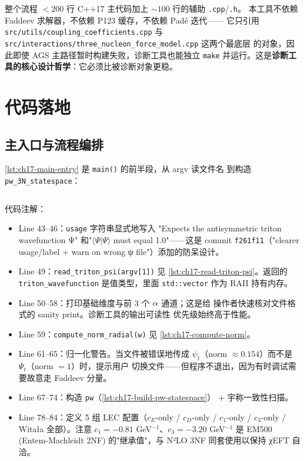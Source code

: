 整个流程 \(<200\) 行 C++17 主代码加上 \(\sim 100\) 行的辅助 \texttt{.cpp}/\texttt{.h}。
本工具不依赖 Faddeev 求解器，不依赖 P123 缓存，不依赖 Padé 迭代——
它只引用 \texttt{src/utils/coupling\_coefficients.cpp} 与
\texttt{src/interactions/three\_nucleon\_force\_model.cpp} 这两个最底层
的对象，因此即使 AGS 主路径暂时构建失败，诊断工具也能独立 \texttt{make}
并运行。这是\textbf{诊断工具的核心设计哲学}：它必须比被诊断对象更稳。

\section{代码落地}
\label{sec:ch17-code}

\subsection{主入口与流程编排}
\label{subsec:ch17-code-main}

\cref{lst:ch17-main-entry} 是 \texttt{main()} 的前半段，从 argv 读文件名
到构造 \texttt{pw\_3N\_statespace}：

\begin{lstlisting}[style=cpp, caption={check\_3nf\_normalization.cpp 主入口与归一化检查 (lines 41--86)}, label={lst:ch17-main-entry}]
\end{lstlisting}


代码注解：

\begin{itemize}
  \item Line 43--46：\texttt{usage} 字符串显式地写入 "Expects the
        antisymmetric triton wavefunction Ψ" 和"\(\langle\Psi|\Psi\rangle\)
        must equal 1.0"——这是 commit \texttt{f261f11}（"clearer
        usage/label + warn on wrong ψ file"）添加的防呆设计。
  \item Line 49：\texttt{read\_triton\_psi(argv[1])} 见
        \cref{lst:ch17-read-triton-psi}。返回的 \texttt{triton\_wavefunction}
        是值类型，里面 \texttt{std::vector} 作为 RAII 持有内存。
  \item Line 50--58：打印基础维度与前 3 个 \(\alpha\) 通道；这是给
        操作者快速核对文件格式的 sanity print。诊断工具的输出可读性
        优先级始终高于性能。
  \item Line 59：\texttt{compute\_norm\_radial(w)} 见
        \cref{lst:ch17-compute-norm}。
  \item Line 61--65：归一化警告。当文件被错误地传成 \(\psi_t\)（norm
        \(\approx 0.154\)）而不是 \(\Psi_t\)（norm \(=1\)）时，提示用户
        切换文件——但程序不退出，因为有时调试需要故意走 Faddeev 分量。
  \item Line 67--74：构造 \texttt{pw}（\cref{lst:ch17-build-pw-statespace}）
        + 宇称一致性扫描。
  \item Line 78--84：定义 5 组 LEC 配置（\(c_E\)-only / \(c_D\)-only /
        \(c_1\)-only / \(c_3\)-only / Witała 全部）。注意 \(c_1 = -0.81\)
        GeV\(^{-1}\)、\(c_3 = -3.20\) GeV\(^{-1}\) 是 EM500 (Entem-Machleidt
        2NF) 的"继承值"，与 N²LO 3NF 同套使用以保持 χEFT 自洽。
\end{itemize}

